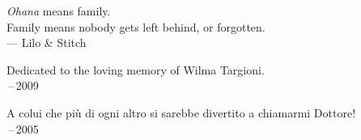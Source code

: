 \thispagestyle{empty}
{}

\vspace*{3cm}

\begin{center}
    \emph{Ohana} means family. \\
    Family means nobody gets left behind, or forgotten. \\ \medskip
    --- Lilo \& Stitch    
\end{center}

\medskip

\begin{center}
    Dedicated to the loving memory of Wilma Targioni. \\ \,--\,2009
\end{center}

\begin{center}
    A colui che pi\`u di ogni altro si sarebbe divertito a chiamarmi \flqq Dottore! \frqq \\ \,--\,2005
\end{center}
